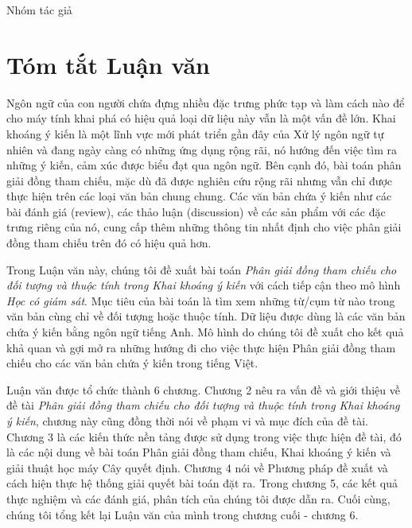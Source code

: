 \documentclass[12pt]{report}
\begin{document}
		\begin{flushright}
			Nhóm tác giả
		\end{flushright}

\newpage
	\thispagestyle{empty}
	\tableofcontents

\newpage
	\listoffigures
	\listoftables

\newpage
	\chapter{Tóm tắt Luận văn}	
		\par Ngôn ngữ của con người chứa đựng nhiều đặc trưng phức tạp và làm cách nào để cho máy tính khai phá có hiệu quả loại dữ liệu này vẫn là một vấn đề lớn. Khai khoáng ý kiến là một lĩnh vực mới phát triển gần đây của Xử lý ngôn ngữ tự nhiên và đang ngày càng có những ứng dụng rộng rãi, nó hướng đến việc tìm ra những ý kiến, cảm xúc được biểu đạt qua ngôn ngữ. Bên cạnh đó, bài toán phân giải đồng tham chiếu, mặc dù đã được nghiên cứu rộng rãi nhưng vẫn chỉ được thực hiện trên các loại văn bản chung chung. Các văn bản chứa ý kiến như các bài đánh giá (review), các thảo luận (discussion) về các sản phẩm với các đặc trưng riêng của nó, cung cấp thêm những thông tin nhất định cho việc phân giải đồng tham chiếu trên đó có hiệu quả hơn. 
		\par Trong Luận văn này, chúng tôi đề xuất bài toán \textit{Phân giải đồng tham chiếu cho đối tượng và thuộc tính trong Khai khoáng ý kiến} với cách tiếp cận theo mô hình \textit{Học có giám sát}. Mục tiêu của bài toán là tìm xem những từ/cụm từ nào trong văn bản cùng chỉ về đối tượng hoặc thuộc tính. Dữ liệu được dùng là các văn bản chứa ý kiến bằng ngôn ngữ tiếng Anh. Mô hình do chúng tôi đề xuất cho kết quả khả quan và gợi mở ra những hướng đi cho việc thực hiện Phân giải đồng tham chiếu cho các văn bản chứa ý kiến trong tiếng Việt.
		\par Luận văn được tổ chức thành 6 chương. Chương 2 nêu ra vấn đề và giới thiệu về đề tài \textit{Phân giải đồng tham chiếu cho đối tượng và thuộc tính trong Khai khoáng ý kiến}, chương này cũng đồng thời nói về phạm vi và mục đích của đề tài. Chương 3 là các kiến thức nền tảng được sử dụng trong việc thực hiện đề tài, đó là các nội dung về bài toán Phân giải đồng tham chiếu, Khai khoáng ý kiến và giải thuật học máy Cây quyết định. Chương 4 nói về Phương pháp đề xuất và cách hiện thực hệ thống giải quyết bài toán đặt ra. Trong chương 5, các kết quả thực nghiệm và các đánh giá, phân tích của chúng tôi được dẫn ra. Cuối cùng, chúng tôi tổng kết lại Luận văn của mình trong chương cuối - chương 6.
		
\end{document}
